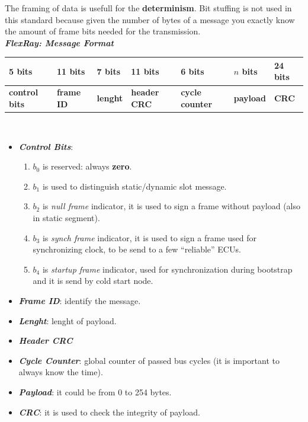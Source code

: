 The framing of data is usefull for the \textbf{determinism}. Bit stuffing is not used in this standard because given the number of bytes of a message you exactly know the amount of frame bits needed for the transmission. \\ \newline
\textbf{\textit{FlexRay: Message Format}} \\ \newline
\begin{tabular}{ | p{2cm} | p{2cm} |  p{2cm} |  p{2cm} |  p{2cm} |  p{2cm} |  p{2cm} | } \hline
    5 bits & 11 bits & 7 bits & 11 bits & 6 bits & $n$ bits & 24 bits \\ \hline
    \textbf{control bits} & \textbf{frame ID} & \textbf{lenght} & \textbf{header CRC} & \textbf{cycle counter} & \textbf{payload} & \textbf{CRC} \\ \hline
\end{tabular}
 \\
\begin{itemize}[nosep]
    \item \textbf{\textit{Control Bits}}:
    \begin{enumerate}[nosep]
        \item $b_0$ is reserved: always \textbf{zero}.
        \item $b_1$ is used to distinguish static/dynamic slot message.
        \item $b_2$ is \textit{null frame} indicator, it is used to sign a frame without payload (also in static segment).
        \item $b_3$ is \textit{synch frame} indicator, it is used to sign a frame used for synchronizing clock, to be send to a few ``reliable'' ECUs.
        \item $b_4$ is \textit{startup frame} indicator, used for synchronization during bootstrap and it is send by cold start node.
    \end{enumerate}
    \item \textbf{\textit{Frame ID}}: identify the message.
    \item \textbf{\textit{Lenght}}: lenght of payload.
    \item \textbf{\textit{Header CRC}}
    \item \textbf{\textit{Cycle Counter}}: global counter of passed bus cycles (it is important to always know the time).
    \item \textbf{\textit{Payload}}: it could be from 0 to 254 bytes.
    \item \textbf{\textit{CRC}}: it is used to check the integrity of payload.
\end{itemize}
